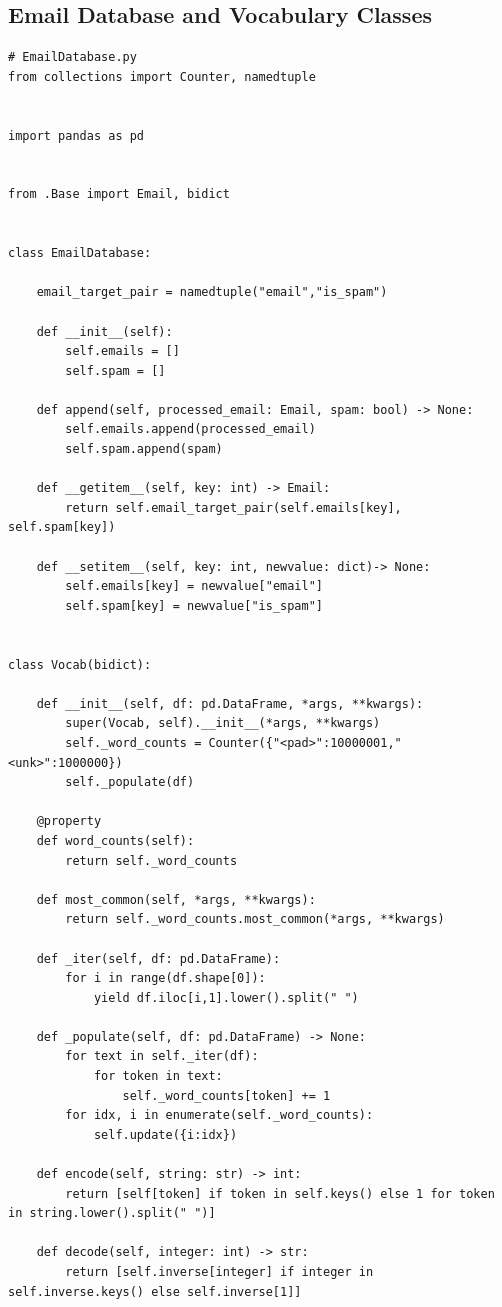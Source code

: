 \documentclass[10pt,a4paper]{article}
\begin{document}
\subsection{Email Database and Vocabulary Classes}

\begin{lstlisting}
# EmailDatabase.py
from collections import Counter, namedtuple


import pandas as pd


from .Base import Email, bidict


class EmailDatabase:

    email_target_pair = namedtuple("email","is_spam")

    def __init__(self):
        self.emails = []
        self.spam = []

    def append(self, processed_email: Email, spam: bool) -> None:
        self.emails.append(processed_email)
        self.spam.append(spam)
    
    def __getitem__(self, key: int) -> Email:
        return self.email_target_pair(self.emails[key], self.spam[key])
    
    def __setitem__(self, key: int, newvalue: dict)-> None:
        self.emails[key] = newvalue["email"]
        self.spam[key] = newvalue["is_spam"]


class Vocab(bidict):

    def __init__(self, df: pd.DataFrame, *args, **kwargs):
        super(Vocab, self).__init__(*args, **kwargs)
        self._word_counts = Counter({"<pad>":10000001,"<unk>":1000000})
        self._populate(df)

    @property
    def word_counts(self):
        return self._word_counts

    def most_common(self, *args, **kwargs):
        return self._word_counts.most_common(*args, **kwargs)

    def _iter(self, df: pd.DataFrame):
        for i in range(df.shape[0]):
            yield df.iloc[i,1].lower().split(" ")

    def _populate(self, df: pd.DataFrame) -> None:
        for text in self._iter(df):
            for token in text:
                self._word_counts[token] += 1
        for idx, i in enumerate(self._word_counts):
            self.update({i:idx})

    def encode(self, string: str) -> int:
        return [self[token] if token in self.keys() else 1 for token in string.lower().split(" ")]
    
    def decode(self, integer: int) -> str:
        return [self.inverse[integer] if integer in self.inverse.keys() else self.inverse[1]]

\end{lstlisting}
\end{document}
